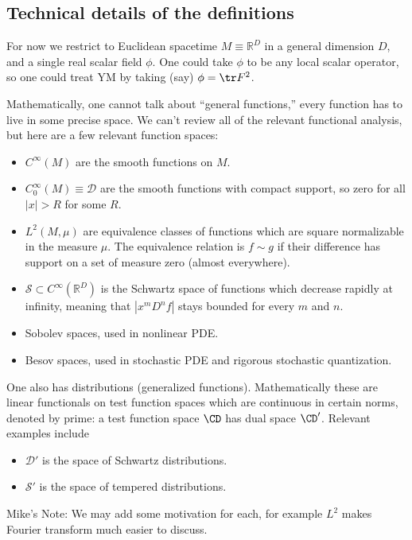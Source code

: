 \documentclass{article}
\newcommand{\1}{\mathbbm{1}}
\theoremstyle{plain}
\theoremstyle{definition}
\numberwithin{equation}{section}
\def\IR{\mathbb{R}}
\newcommand{\cD}{\mathcal D}
\newcommand{\cS}{\mathcal S}
\newcommand\MRD[1]{{\color{red} Mike's Note: #1}}
\begin{document}
\subsection{Technical details of the definitions}

For now we restrict to Euclidean spacetime $M \equiv \IR^D$ in a general dimension $D$, and a single real scalar field $\phi$.
One could take $\phi$ to be any local scalar operator, so one could treat YM by taking (say) $\phi=\tr F^2$.

Mathematically, one cannot talk about ``general functions,'' every function has to live in some precise space.  
We can't review all of the relevant functional analysis, but here are a few relevant function spaces:
\begin{itemize}
    \item $C^\infty(M)$ are the smooth functions on $M$. 
    \item $C_0^\infty(M) \equiv \cD$ are the smooth functions with compact support, so zero for all $|x|>R$ for some $R$.
    \item $L^2(M,\mu)$ are equivalence classes of functions which are square normalizable in the measure $\mu$.   The equivalence relation
    is $f \sim g$ if their difference has support on a set of measure zero (almost everywhere).
    \item $\cS \subset C^\infty(\IR^D)$ is the Schwartz space of functions which decrease rapidly at infinity, meaning that
    $|x^m D^n f|$ stays bounded for every $m$ and $n$.
    \item Sobolev spaces, used in nonlinear PDE.
    \item Besov spaces, used in stochastic PDE and rigorous stochastic quantization.
\end{itemize}
One also has distributions (generalized functions).  Mathematically these are linear functionals
on test function spaces which are continuous in certain norms, denoted by prime: 
a test function space $\CD$ has dual space $\CD'$.  
Relevant examples include 
\begin{itemize}
    \item $\cD'$ is the space of Schwartz distributions.
    \item $\cS'$ is the space of tempered distributions.
\end{itemize}
\MRD{We may add some motivation for each, for example $L^2$ makes Fourier transform much easier to discuss.}
\end{document}
